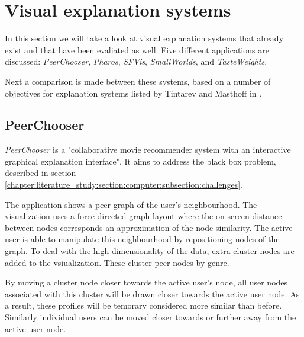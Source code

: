 % 
\section{Visual explanation systems}\label{chapter:survey:section:applications}

In this section we will take a look at visual explanation systems that already exist and that have been evaliated as well. Five different applications are discussed: \emph{PeerChooser}, \emph{Pharos}, \emph{SFVis}, \emph{SmallWorlds}, and \emph{TasteWeights}.

Next a comparison is made between these systems, based on a number of objectives for explanation systems listed by Tintarev and Masthoff in \cite{tintarev:2007:SER:1547550.1547664}.



\subsection{PeerChooser}\label{chapter:survey:section:applications:subsection:peerchooser}

\emph{PeerChooser} is a "collaborative movie recommender system with an interactive graphical explanation interface"\cite{odonovan:2008}. It aims to address the black box problem, described in section \ref{chapter:literature_study:section:computer:subsection:challenges}\cite{odonovan:2008}.

The application shows a peer graph of the user's neighbourhood. The visualization uses a force-directed graph layout where the on-screen distance between nodes corresponds an approximation of the node similarity. The active user is able to manipulate this neighbourhood by repositioning nodes of the graph. To deal with the high dimensionality of the data, extra cluster nodes are added to the vsiualization. These cluster peer nodes by genre\cite{odonovan:2008}.

By moving a cluster node closer towards the active user's node, all user nodes associated with this cluster will be drawn closer towards the active user node. As a result, these profiles will be temorary considered more similar than before. Similarly individual users can be moved closer towards or further away from the active user node\cite{odonovan:2008}.

